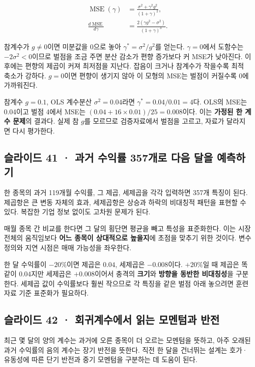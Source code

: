 \documentclass[11pt,a4paper]{article}
\begin{document}
\[
\begin{aligned}
\operatorname{MSE}(\gamma)&=\frac{\sigma^2+\gamma^2g^2}{(1+\gamma)^2},\\
\frac{d\operatorname{MSE}}{d\gamma}
&=\frac{2(\gamma g^2-\sigma^2)}{(1+\gamma)^3}.
\end{aligned}
\]

참계수가 $g\ne0$이면 미분값을 0으로 놓아 $\gamma^*=\sigma^2/g^2$를 얻는다. $\gamma=0$에서 도함수는 $-2\sigma^2<0$이므로 벌점을 조금 주면 분산 감소가 편향 증가보다 커 MSE가 낮아진다. 이후에는 편향의 제곱이 커져 최저점을 지난다. 잡음이 크거나 참계수가 작을수록 최적 축소가 강하다. $g=0$이면 편향이 생기지 않아 이 모형의 MSE는 벌점이 커질수록 0에 가까워진다.\par

참계수 $g=0.1$, OLS 계수분산 $\sigma^2=0.04$라면 $\gamma^*=0.04/0.01=4$다. OLS의 MSE는 0.04이고 벌점 4에서 MSE는 $(0.04+16\times0.01)/25=0.008$이다. 이는 \textbf{가정된 한 계수 문제}의 결과다. 실제 참 $g$를 모르므로 검증자료에서 벌점을 고르고, 자료가 달라지면 다시 평가한다.\par

\subsection{슬라이드 41 · 과거 수익률 357개로 다음 달을 예측하기}
한 종목의 과거 119개월 수익률, 그 제곱, 세제곱을 각각 입력하면 357개 특징이 된다. 제곱항은 큰 변동 자체의 효과, 세제곱항은 상승과 하락의 비대칭적 패턴을 표현할 수 있다. 복잡한 기업 정보 없이도 고차원 문제가 된다.\par

매월 종목 간 비교를 한다면 그 달의 횡단면 평균을 빼고 특성을 표준화한다. 이는 시장 전체의 움직임보다 \textbf{어느 종목이 상대적으로 높을지}에 초점을 맞추기 위한 것이다. 변수 정의와 지연 시점은 매매 가능성을 좌우한다.\par

한 달 수익률이 $-20\%$이면 제곱은 $0.04$, 세제곱은 $-0.008$이다. $+20\%$일 때 제곱은 똑같이 $0.04$지만 세제곱은 $+0.008$이어서 충격의 \textbf{크기}와 \textbf{방향을 동반한 비대칭성}을 구분한다. 세제곱 값이 수익률보다 훨씬 작으므로 각 특징을 같은 벌점 아래 놓으려면 훈련자료 기준 표준화가 필요하다.\par

\subsection{슬라이드 42 · 회귀계수에서 읽는 모멘텀과 반전}
최근 몇 달의 양의 계수는 과거에 오른 종목이 더 오르는 모멘텀을 뜻하고, 아주 오래된 과거 수익률의 음의 계수는 장기 반전을 뜻한다. 직전 한 달을 건너뛰는 설계는 호가·유동성에 따른 단기 반전과 중기 모멘텀을 구분하는 데 도움이 된다.\par
\end{document}
